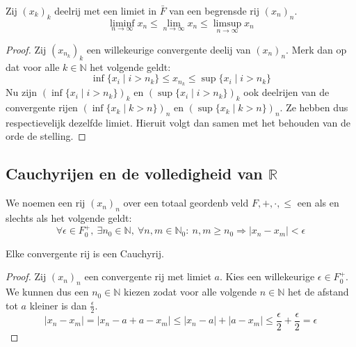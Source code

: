 \documentclass[main.tex]{subfiles}
\begin{document}
\begin{pr}
  Zij $(x_{k})_{k}$ deelrij met een limiet in $\bar{F}$ van een begrensde rij $(x_{n})_{n}$.
  \[ \liminf_{n\rightarrow \infty} x_{n} \le \lim_{n\rightarrow \infty} x_{n} \le \limsup_{n\rightarrow \infty} x_{n} \]

  \begin{proof}
    Zij $(x_{n_{k}})_{k}$ een willekeurige convergente deelij van $(x_{n})_{n}$.
    Merk dan op dat voor alle $k\in \mathbb{N}$ het volgende geldt:
    \[ \inf\{x_{i}\mid i>n_{k}\} \le x_{n_{k}} \le \sup\{x_{i}\mid i>n_{k}\}\]
    Nu zijn $(\inf\{x_{i}\mid i>n_{k}\})_{k}$ en $(\sup\{x_{i}\mid i>n_{k}\})_{k}$ ook deelrijen van de convergente rijen $(\inf\{x_{k}\mid k>n\})_{n}$ en $(\sup\{x_{k}\mid k>n\})_{n}$.
    Ze hebben dus respectievelijk dezelfde limiet.
    Hieruit volgt dan samen met het behouden van de orde de stelling.
  \end{proof}
\end{pr}

\subsection{Cauchyrijen en de volledigheid van $\mathbb{R}$}
\label{sec:cauchyrijen-en-de}

\begin{de}
  We noemen een rij $(x_{n})_{n}$ over een totaal geordenb veld $F,+,\cdot,\le$ een  als en slechts als het volgende geldt:
  \[ \forall \epsilon \in F_{0}^{+},\ \exists n_{0}\in \mathbb{N},\ \forall n,m \in \mathbb{N}_{0}:\ n,m \ge n_{0} \Rightarrow |x_{n}-x_{m}| < \epsilon \]
\end{de}

\begin{pr}
  \label{pr:convergent-dan-cauchy}
  Elke convergente rij is een Cauchyrij.
  
  \begin{proof}
    Zij $(x_{n})_{n}$ een convergente rij met limiet $a$.
    Kies een willekeurige $\epsilon\in F_{0}^{+}$.
    We kunnen dus een $n_{0}\in \mathbb{N}$ kiezen zodat voor alle volgende $n\in\mathbb{N}$ het de afstand tot $a$ kleiner is dan $\frac{\epsilon}{2}$.
    \[ |x_{n}-x_{m}| = |x_{n}-a+a-x_{m}| \le |x_{n}-a|+|a-x_{m}| \le \frac{\epsilon}{2}+\frac{\epsilon}{2}=\epsilon \]
  \end{proof}
\end{pr}
\end{document}
